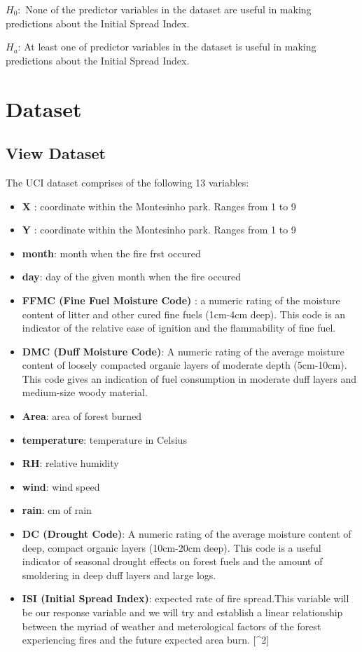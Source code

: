 \documentclass[conference,final,]{IEEEtran}
\begin{document}
\(H_{0}:\) None of the predictor variables in the dataset are useful in
making predictions about the Initial Spread Index.

\(H_{a}\): At least one of predictor variables in the dataset is useful
in making predictions about the Initial Spread Index.

\hypertarget{dataset}{%
\section{Dataset}\label{dataset}}

\hypertarget{view-dataset}{%
\subsection{View Dataset}\label{view-dataset}}

The UCI dataset comprises of the following 13 variables:

\begin{itemize}
\item
  \textbf{X} : coordinate within the Montesinho park. Ranges from 1 to 9
\item
  \textbf{Y} : coordinate within the Montesinho park. Ranges from 1 to 9
\item
  \textbf{month}: month when the fire frst occured 
\item
  \textbf{day}: day of the given month when the fire occured 
\item
  \textbf{FFMC (Fine Fuel Moisture Code)} : a numeric rating of the
  moisture content of litter and other cured fine fuels (1cm-4cm deep).
  This code is an indicator of the relative ease of ignition and the
  flammability of fine fuel. 
\item
  \textbf{DMC (Duff Moisture Code)}: A numeric rating of the average
  moisture content of loosely compacted organic layers of moderate depth
  (5cm-10cm). This code gives an indication of fuel consumption in
  moderate duff layers and medium-size woody material. 
\item
  \textbf{Area}: area of forest burned 
\item
  \textbf{temperature}: temperature in Celsius 
\item
  \textbf{RH}: relative humidity 
\item
  \textbf{wind}: wind speed 
\item
  \textbf{rain}: cm of rain 
\item
  \textbf{DC (Drought Code)}: A numeric rating of the average moisture
  content of deep, compact organic layers (10cm-20cm deep). This code is
  a useful indicator of seasonal drought effects on forest fuels and the
  amount of smoldering in deep duff layers and large logs. 
\item
  \textbf{ISI (Initial Spread Index)}: expected rate of fire spread.This
  variable will be our response variable and we will try and establish a
  linear relationship between the myriad of weather and meterological
  factors of the forest experiencing fires and the future expected area
  burn. {[}\^{}2{]} 
\end{itemize}
\end{document}
